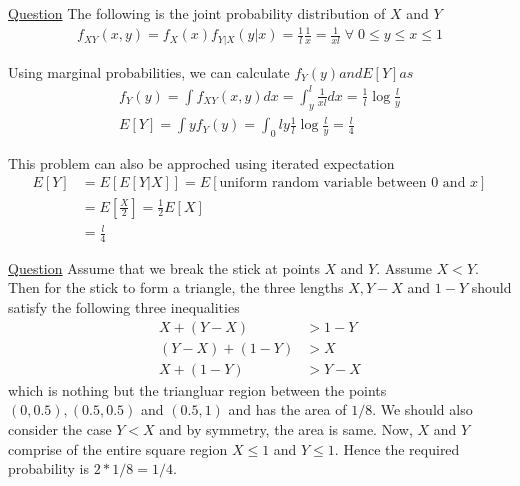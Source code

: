 \documentclass[11pt, a4paper]{article}
\begin{document}
\begin{enumerate}
        \hypertarget{a_breakstick}{\item} \hyperlink{q_breakstick}{Question}\newline
        The following is the joint probability distribution of $X$ and $Y$
        \begin{align*}
            f_{XY}(x, y) = f_{X}(x) f_{Y|X}(y|x) = \frac{1}{l} \frac{1}{x} = \frac{1}{xl} \;\forall\; 0 \leq y \leq x \leq 1
        \end{align*}
        
        Using marginal probabilities, we can calculate $f_{Y}(y) and E[Y] as$
        \begin{align*}
            f_{Y}(y) = \int f_{XY}(x,y) dx = \int_{y}^{l} \frac{1}{xl} dx = \frac{1}{l} \log \frac{l}{y} \tag*{Note that for any $y$, $y \leq x \leq l$}\\
            E[Y] = \int y f_{Y}(y) = \int_{0}{l} y \frac{1}{l} \log\frac{l}{y} = \frac{l}{4}
        \end{align*}

        This problem can also be approched using iterated expectation
        \begin{align*}
            E[Y] &= E[E[Y|X]] = E[\text{uniform random variable between $0$ and $x$}]\\
                &= E[\frac{X}{2}] =\frac{1}{2}E[X]\\
                &= \frac{l}{4} 
        \end{align*}

        \hypertarget{a_trianglestick}{\item} \hyperlink{q_trianglestick}{Question}\newline
        Assume that we break the stick at points $X$ and $Y$. Assume $X < Y$. Then for the stick to form a triangle, the three lengths $X, Y-X$ and $1-Y$ should satisfy the following three inequalities
        \begin{align*}
            X+(Y-X) &> 1-Y\\
            (Y-X) + (1-Y) &> X\\
            X + (1-Y) &> Y-X
        \end{align*}
        which is nothing but the triangluar region between the points $(0, 0.5), (0.5, 0.5)$ and $(0.5, 1)$ and has the area of $1/8$. We should also consider the case $Y < X$ and by symmetry, the area is same. Now, $X$ and $Y$ comprise of the entire square region $X \leq 1$ and $Y \leq 1$. Hence the required probability is $2 * 1/8 = 1/4$.


\end{enumerate}
\end{document}
